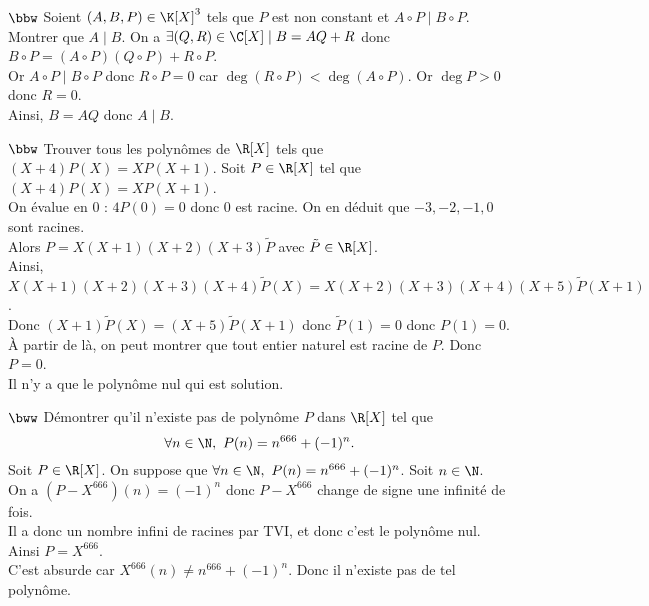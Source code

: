\documentclass[11pt]{article}
\begin{document}
\begin{exercice}{$\bbw$}{}
    Soient $(A,B,P)\in\K[X]^3$ tels que $P$ est non constant et $A\circ P \mid B\circ P$. Montrer que $A\mid B$.
    \tcblower
    On a $\exists (Q,R) \in \C[X] \mid B = AQ+R$ donc $B\circ P = (A\circ P)(Q\circ P)+R\circ P$.\\
    Or $A\circ P\mid B\circ P$ donc $R\circ P=0$ car $\deg(R\circ P)<\deg(A\circ P)$. Or $\deg P > 0$ donc $R=0$.\\
    Ainsi, $B=AQ$ donc $A\mid B$. 
\end{exercice}

\begin{exercice}{$\bbw$}{}
    Trouver tous les polynômes de $\R[X]$ tels que $(X+4)P(X)=XP(X+1)$.
    \tcblower
    Soit $P\in\R[X]$ tel que $(X+4)P(X)=XP(X+1)$.\\
    On évalue en 0 : $4P(0)=0$ donc $0$ est racine. On en déduit que $-3,-2,-1,0$ sont racines.\\
    Alors $P=X(X+1)(X+2)(X+3)\tilde{P}$ avec $\tilde{P}\in\R[X]$.\\
    Ainsi, $X(X+1)(X+2)(X+3)(X+4)\tilde{P}(X)=X(X+2)(X+3)(X+4)(X+5)\tilde{P}(X+1)$.\\
    Donc $(X+1)\tilde{P}(X)=(X+5)\tilde{P}(X+1)$ donc $\tilde{P}(1)=0$ donc $P(1)=0$.\\
    À partir de là, on peut montrer que tout entier naturel est racine de $P$. Donc $P=0$.\\
    Il n'y a que le polynôme nul qui est solution.
\end{exercice}

\pagebreak

\begin{exercice}{$\bww$}{}
    Démontrer qu'il n'existe pas de polynôme $P$ dans $\R[X]$ tel que
    \begin{equation*}
        \forall n\in\N, ~ P(n)=n^{666}+(-1)^n.
    \end{equation*}
    \tcblower
    Soit $P\in\R[X]$. On suppose que $\forall n \in \N, ~ P(n)=n^{666}+(-1)^n$. Soit $n\in\N$.\\
    On a $(P-X^{666})(n)=(-1)^n$ donc $P-X^{666}$ change de signe une infinité de fois.\\
    Il a donc un nombre infini de racines par TVI, et donc c'est le polynôme nul. Ainsi $P=X^{666}$.\\
    C'est absurde car $X^{666}(n)\neq n^{666} + (-1)^n$. Donc il n'existe pas de tel polynôme.
\end{exercice}
\end{document}
